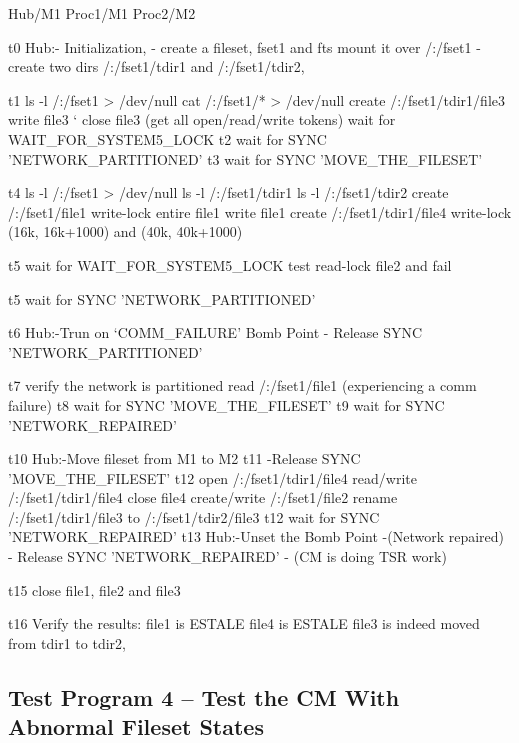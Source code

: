 \begin{programexample}

    Hub/M1		Proc1/M1			Proc2/M2
	 	 
t0  Hub:- Initialization,
	- create a fileset, fset1 and fts mount it over /:/fset1
	- create two dirs /:/fset1/tdir1 and /:/fset1/tdir2, 

t1							ls -l /:/fset1  > /dev/null
							cat /:/fset1/* > /dev/null
							create /:/fset1/tdir1/file3
							write file3
	`						close file3
							(get all open/read/write tokens)
							wait for WAIT_FOR_SYSTEM5_LOCK
t2							wait for SYNC 'NETWORK_PARTITIONED'
t3							wait for SYNC 'MOVE_THE_FILESET'

t4			ls -l /:/fset1 > /dev/null
			ls -l /:/fset1/tdir1
			ls -l /:/fset1/tdir2
			create /:/fset1/file1
			write-lock entire file1
			write file1
			create /:/fset1/tdir1/file4
			write-lock (16k, 16k+1000) and (40k, 40k+1000)

t5			wait for WAIT_FOR_SYSTEM5_LOCK
			test read-lock file2 and fail
			
t5			wait for SYNC 'NETWORK_PARTITIONED'

t6  Hub:-Trun on `COMM_FAILURE' Bomb Point
	- Release SYNC 'NETWORK_PARTITIONED'


t7			verify the network is partitioned
			read /:/fset1/file1 
			(experiencing a comm failure)
t8			wait for SYNC 'MOVE_THE_FILESET'
t9			wait for SYNC 'NETWORK_REPAIRED'
		
t10 Hub:-Move fileset from M1 to M2
t11	-Release SYNC 'MOVE_THE_FILESET'
t12							open  /:/fset1/tdir1/file4
							read/write /:/fset1/tdir1/file4
							close file4
							create/write /:/fset1/file2
							rename /:/fset1/tdir1/file3 to 
							       /:/fset1/tdir2/file3
t12							wait for SYNC 'NETWORK_REPAIRED'
t13 Hub:-Unset the Bomb Point 
	-(Network repaired)
	- Release SYNC 'NETWORK_REPAIRED'
	- (CM is doing TSR work)

t15							close file1, file2 and file3

t16			Verify the results:
			file1 is ESTALE
			file4 is ESTALE
			file3 is indeed moved from tdir1 to tdir2,	


\end{programexample}

\pagebreak 
\subsection {Test Program 4 -- Test the CM With Abnormal Fileset States}

